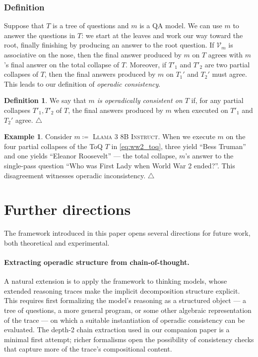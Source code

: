\documentclass{article}
\theoremstyle{plain}
\theoremstyle{definition}
\newtheorem{definition}[theorem]{Definition}
\theoremstyle{remark}
\theoremstyle{definition}
\newtheorem{example}[theorem]{Example}
\newcommand\cV{\mathcal{V}}
\begin{document}
\subsubsection{Definition}
\label{sss:operadic_consistency}

Suppose that $T$ is a tree of questions and $m$ is a QA model.
We can use $m$ to answer the questions in $T$: we start at the leaves and work our way toward the root, finally finishing by producing an answer to the root question.
If $\cV_m$ is associative on the nose, then the final answer produced by $m$ on $T$ agrees with $m$'s final answer on the total collapse of $T$.
Moreover, if $T'_1$ and $T'_2$ are two partial collapses of $T$, then the final answers produced by $m$ on $T_1'$ and $T_2'$ must agree.
This leads to our definition of \emph{operadic consistency}.

\begin{definition}
We say that \emph{$m$ is operadically consistent on $T$} if, for any partial collapses $T'_1, T'_2$ of $T$, the final answers produced by $m$ when executed on $T'_1$ and $T_2'$ agree.
\null\hfill$\triangle$
\end{definition}

\begin{example}
Consider $m\coloneqq$ \textsc{Llama 3 8B Instruct}.
When we execute $m$ on the four partial collapses of the ToQ $T$ in \eqref{eq:ww2_toq}, three yield ``Bess Truman'' and one yields ``Eleanor Roosevelt'' --- the total collapse, $m$'s answer to the single-pass question ``Who was First Lady when World War 2 ended?''.
This disagreement witnesses operadic inconsistency.
$\triangle$
\end{example}

\section{Further directions}
\label{s:further_directions}

The framework introduced in this paper opens several directions for future work, both theoretical and experimental.

\paragraph{Extracting operadic structure from chain-of-thought.}
A natural extension is to apply the framework to thinking models, whose extended reasoning traces make the implicit decomposition structure explicit.
This requires first formalizing the model's reasoning as a structured object --- a tree of questions, a more general program, or some other algebraic representation of the trace --- on which a suitable instantiation of operadic consistency can be evaluated.
The depth-2 chain extraction used in our companion paper \citep{bottman:operadic_consistency_empirical} is a minimal first attempt; richer formalisms open the possibility of consistency checks that capture more of the trace's compositional content.
\end{document}
